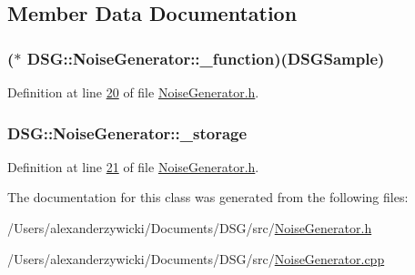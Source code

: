 \subsection{Member Data Documentation}
\hypertarget{class_d_s_g_1_1_noise_generator_a3fe30476196e0bfa22e314ce9bbd368b}{
\subsubsection[{\+\_\+function}]{($\ast$ D\+S\+G\+::\+Noise\+Generator\+::\+\_\+function)({\bf D\+S\+G\+Sample})\hspace{0.3cm}{\ttfamily [protected]}}}\label{class_d_s_g_1_1_noise_generator_a3fe30476196e0bfa22e314ce9bbd368b}


Definition at line \hyperlink{_noise_generator_8h_source_l00020}{20} of file \hyperlink{_noise_generator_8h_source}{Noise\+Generator.\+h}.

\hypertarget{class_d_s_g_1_1_noise_generator_adb363b56bb2f621849fa457d54fc46a6}{
\subsubsection[{\+\_\+storage}]{ D\+S\+G\+::\+Noise\+Generator\+::\+\_\+storage\hspace{0.3cm}{\ttfamily [protected]}}}\label{class_d_s_g_1_1_noise_generator_adb363b56bb2f621849fa457d54fc46a6}


Definition at line \hyperlink{_noise_generator_8h_source_l00021}{21} of file \hyperlink{_noise_generator_8h_source}{Noise\+Generator.\+h}.



The documentation for this class was generated from the following files\+:\begin{DoxyCompactItemize}
\item 
/\+Users/alexanderzywicki/\+Documents/\+D\+S\+G/src/\hyperlink{_noise_generator_8h}{Noise\+Generator.\+h}\item 
/\+Users/alexanderzywicki/\+Documents/\+D\+S\+G/src/\hyperlink{_noise_generator_8cpp}{Noise\+Generator.\+cpp}\end{DoxyCompactItemize}
